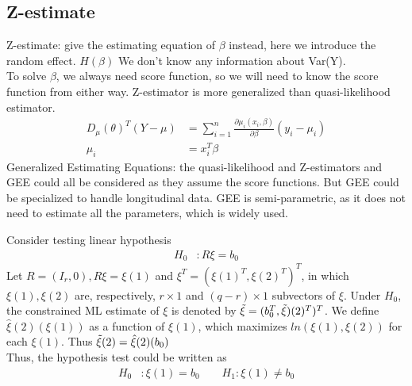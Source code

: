 \documentclass[11pt]{article} %
\begin{document}
\subsection{Z-estimate}
 Z-estimate: give the estimating equation of $\beta$ instead, here we introduce the random effect. $H(\beta)$ We don't know any information about Var(Y).\\
	To solve $\beta$, we always need score function, so we will need to know the score function from either way. Z-estimator is more generalized than quasi-likelihood estimator. \\
	\begin{align}
		D_{\mu}(\theta)^T (Y-\mu) &= \sum_{i=1}^n \frac{\partial \mu_i(x_i, \beta)}{\partial \beta} (y_i-\mu_i)\\
		\mu_i &= x_i^T \beta
	\end{align}
Generalized Estimating Equations: the quasi-likelihood and Z-estimators and GEE could all be considered as they assume the score functions. But GEE could be specialized to handle longitudinal data. GEE is semi-parametric, as it does not need to estimate all the parameters, which is widely used. 





Consider testing linear hypothesis
\begin{align*}
	H_0 &: R \xi = b_0
\end{align*}
Let $R=(I_r, 0), R \xi = \xi{(1)}$ and $\xi^T = (\xi{(1)}^T, \xi(2)^T)^T$, in which $\xi(1), \xi(2)$ are, respectively, $r \times 1$ and $(q-r) \times 1$ subvectors of $\xi$. Under $H_0$, the constrained ML estimate of $\xi$ is denoted by $\Tilde{\xi} = (b_0^T, \Tilde{\xi})(2)^T)^T$. We define $\hat{\xi}(2)(\xi(1))$ as a function of $\xi(1)$, which maximizes $ln(\xi(1), \xi(2))$ for each $\xi(1)$. Thus $\Tilde{\xi}(2) = \hat{\xi}(2)(b_0)$\\
Thus, the hypothesis test could be written as
\begin{align*}
	H_0 &: \xi(1) = b_0 \qquad  H_1 : \xi(1) \neq b_0
\end{align*}
\end{document}
